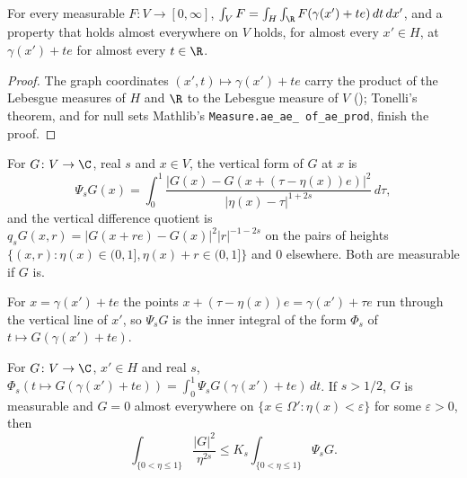 \begin{lemma}
\label{lem:graph-coordinates-integrals}
\leanok
{}
For every measurable $F \colon V \to [0, \infty]$,
$\int_V F = \int_H \int_\R F(\gamma(x') + t e) \, dt \, dx'$, and a property that holds almost
everywhere on $V$ holds, for almost every $x' \in H$, at $\gamma(x') + t e$ for almost every
$t \in \R$.
\end{lemma}

\begin{proof}
\leanok
{}
The graph coordinates $(x', t) \mapsto \gamma(x') + t e$ carry the product of the Lebesgue
measures of $H$ and $\R$ to the Lebesgue measure of $V$ (); Tonelli's
theorem, and for null sets Mathlib's \texttt{Measure.\allowbreak ae\_\allowbreak ae\_\allowbreak
of\_\allowbreak ae\_\allowbreak prod}, finish the proof.
\end{proof}

\begin{definition}
\label{def:vertical-form}
\leanok
{}
For $G \colon V \to \C$, real $s$ and $x \in V$, the vertical form of $G$ at $x$ is
\[
  \Psi_s G(x) = \int_0^1 \frac{|G(x) - G(x + (\tau - \eta(x)) e)|^2}{|\eta(x) - \tau|^{1+2s}}
  \, d\tau ,
\]
and the vertical difference quotient is
$q_s G(x, r) = |G(x + r e) - G(x)|^2 |r|^{-1-2s}$ on the pairs of heights
$\{(x, r) : \eta(x) \in (0, 1], \eta(x) + r \in (0, 1]\}$ and $0$ elsewhere. Both are measurable
if $G$ is.
\end{definition}

For $x = \gamma(x') + t e$ the points $x + (\tau - \eta(x)) e = \gamma(x') + \tau e$ run through
the vertical line of $x'$, so $\Psi_s G$ is the inner integral of the form $\Phi_s$ of
$t \mapsto G(\gamma(x') + t e)$.

\begin{lemma}[{The Hardy inequality on $(0, 1]$ along the vertical lines}]
\label{lem:vertical-hardy}
\leanok
{}
For $G \colon V \to \C$, $x' \in H$ and real $s$,
$\Phi_s(t \mapsto G(\gamma(x') + t e)) = \int_0^1 \Psi_s G(\gamma(x') + t e) \, dt$. If
$s > 1/2$, $G$ is measurable and $G = 0$ almost everywhere on $\{x \in \Omega' : \eta(x) <
\varepsilon\}$ for some $\varepsilon > 0$, then
\[
  \int_{\{0 < \eta \leq 1\}} \frac{|G|^2}{\eta^{2s}} \leq K_s \int_{\{0 < \eta \leq 1\}} \Psi_s G .
\]
\end{lemma}

